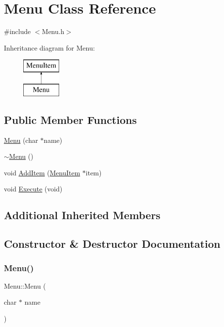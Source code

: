 \hypertarget{class_menu}{}\section{Menu Class Reference}
\label{class_menu}


{\ttfamily \#include $<$Menu.\+h$>$}

Inheritance diagram for Menu\+:\begin{figure}[H]
\begin{center}
\leavevmode
\includegraphics[height=2.000000cm]{class_menu}
\end{center}
\end{figure}
\subsection*{Public Member Functions}
\begin{DoxyCompactItemize}
\item 
\hyperlink{class_menu_aba4c387b52924a1c3cf43508e67a6412}{Menu} (char $\ast$name)
\item 
\hyperlink{class_menu_a831387f51358cfb88cd018e1777bc980}{$\sim$\+Menu} ()
\item 
void \hyperlink{class_menu_aa64e794ec331677883f6be3ec0e0eb5f}{Add\+Item} (\hyperlink{class_menu_item}{Menu\+Item} $\ast$item)
\item 
void \hyperlink{class_menu_a0be077217ae2c0735bd148e8359be21b}{Execute} (void)
\end{DoxyCompactItemize}
\subsection*{Additional Inherited Members}


\subsection{Constructor \& Destructor Documentation}
\mbox{\label{class_menu_aba4c387b52924a1c3cf43508e67a6412}} 
\subsubsection{\texorpdfstring{Menu()}{Menu()}}
{\footnotesize\ttfamily Menu\+::\+Menu (\begin{DoxyParamCaption}\item[{char $\ast$}]{name }\end{DoxyParamCaption})}

